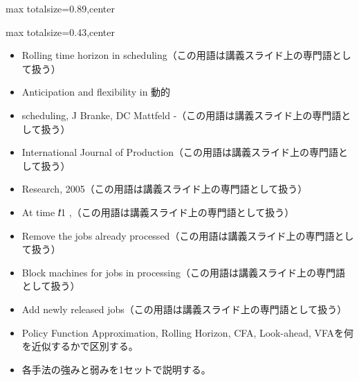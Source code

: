 \begin{minipage}[t]{0.58\textwidth}
\begin{adjustbox}{max totalsize={\textwidth}{0.89\textheight},center}
\begin{minipage}{\textwidth}
\end{minipage}
\end{adjustbox}
\end{minipage}


\clearpage
{}
\begin{minipage}[t]{0.405\textwidth}
\begin{adjustbox}{max totalsize={\textwidth}{0.43\textheight},center}
\begin{minipage}{\textwidth}\scriptsize
{}\begin{itemize}
\item Rolling time horizon in scheduling（この用語は講義スライド上の専門語として扱う）
\item Anticipation and flexibility in 動的
\item scheduling, J Branke, DC Mattfeld -（この用語は講義スライド上の専門語として扱う）
\item International Journal of Production（この用語は講義スライド上の専門語として扱う）
\item Research, 2005（この用語は講義スライド上の専門語として扱う）
\item At time 𝑡1 ,（この用語は講義スライド上の専門語として扱う）
\item Remove the jobs already processed（この用語は講義スライド上の専門語として扱う）
\item Block machines for jobs in processing（この用語は講義スライド上の専門語として扱う）
\item Add newly released jobs（この用語は講義スライド上の専門語として扱う）
\end{itemize}\begin{itemize}
\item Policy Function Approximation, Rolling Horizon, CFA, Look-ahead, VFAを何を近似するかで区別する。
\item 各手法の強みと弱みを1セットで説明する。
\end{itemize}
\end{minipage}
\end{adjustbox}
\end{minipage}\hfill
